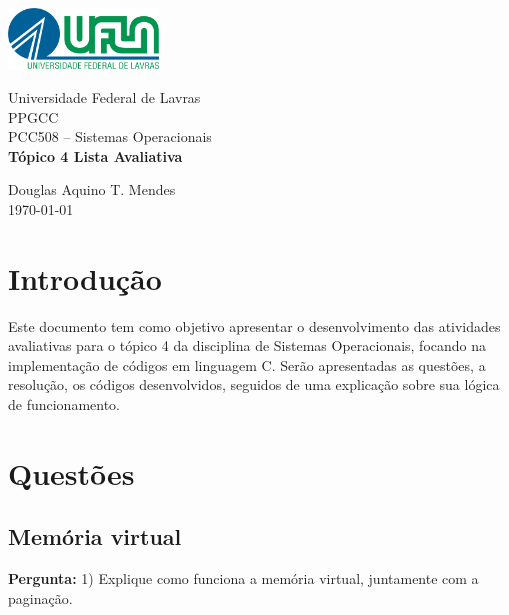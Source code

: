 \documentclass{article}
\begin{document}
\begin{titlepage}
    \centering
    \includegraphics[width=0.3\textwidth]{../../Topic1/Avaliativo/Imagens/Logo UFLA - Colorida chapada.png}

    \vspace*{2cm} %
    \Large
    Universidade Federal de Lavras\\
    PPGCC\\
    PCC508 – Sistemas Operacionais\\
    
    \vspace{2cm} %
    \huge %
    \textbf{Tópico 4 Lista Avaliativa}
    
    \vfill %
    
    \large
    Douglas Aquino T. Mendes\\
    \today %
\end{titlepage}

\tableofcontents
\newpage

\section{Introdução}
Este documento tem como objetivo apresentar o desenvolvimento das atividades avaliativas para o tópico 4 da disciplina de Sistemas Operacionais, focando na implementação de códigos em linguagem C. Serão apresentadas as questões, a resolução, os códigos desenvolvidos, seguidos de uma explicação sobre sua lógica de funcionamento.

\section{Questões}
\subsection{Memória virtual}

\textbf{Pergunta:} 1) Explique como funciona a memória virtual, juntamente com a paginação. \newline
\end{document}
